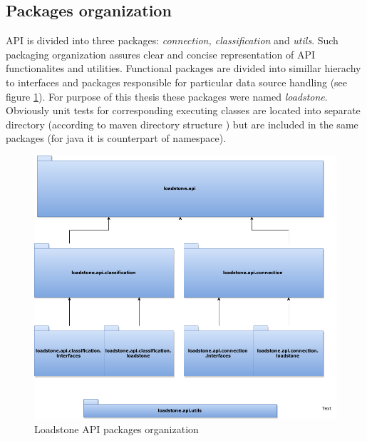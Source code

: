 \subsection{Packages organization}
API is divided into three packages: \textit{connection, classification} and \textit{utils}. Such packaging organization assures clear and concise representation of API functionalites and utilities. Functional packages are divided into simillar hierachy to interfaces and packages responsible for particular data source handling (see figure \ref{fig:@=packages_oragnization}). For purpose of this thesis these packages were named \textit{loadstone}. Obviously unit tests for corresponding executing classes are located into separate directory (according to maven directory structure \cite{20}) but are included in the same packages (for java it is counterpart of namespace).
\begin{figure}[h]
 	\centering
 	\includegraphics[scale=0.5]{loadstone_api_packages.png}
 	\caption{Loadstone API packages organization}
 	\label{fig:@=packages_oragnization}
\end{figure}
